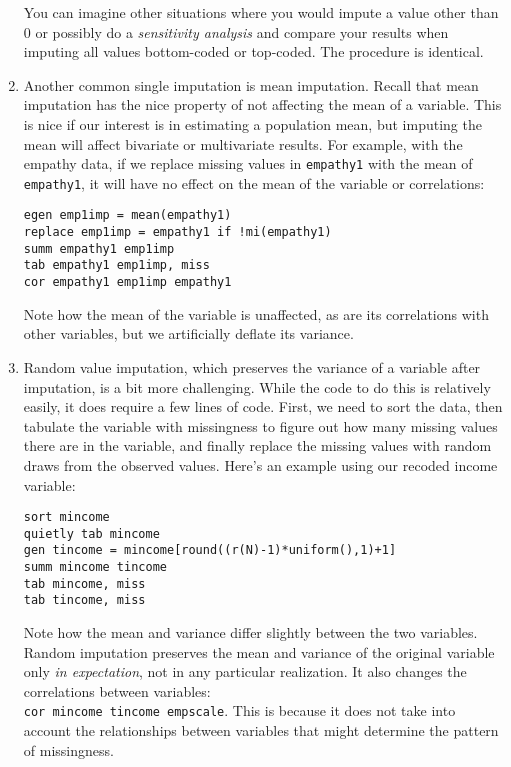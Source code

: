 \documentclass[a4paper,12pt]{article}
\begin{document}
\begin{enumerate}
You can imagine other situations where you would impute a value other than 0 or possibly do a {\em sensitivity analysis} and compare your results when imputing all values bottom-coded or top-coded. The procedure is identical.

\item Another common single imputation is mean imputation. Recall that mean imputation has the nice property of not affecting the mean of a variable. This is nice if our interest is in estimating a population mean, but imputing the mean will affect bivariate or multivariate results. For example, with the empathy data, if we replace missing values in \texttt{empathy1} with the mean of \texttt{empathy1}, it will have no effect on the mean of the variable or correlations:
\begin{verbatim}
egen emp1imp = mean(empathy1)
replace emp1imp = empathy1 if !mi(empathy1)
summ empathy1 emp1imp
tab empathy1 emp1imp, miss
cor empathy1 emp1imp empathy1
\end{verbatim}

Note how the mean of the variable is unaffected, as are its correlations with other variables, but we artificially deflate its variance.

\item Random value imputation, which preserves the variance of a variable after imputation, is a bit more challenging. While the code to do this is relatively easily, it does require a few lines of code. First, we need to sort the data, then tabulate the variable with missingness to figure out how many missing values there are in the variable, and finally replace the missing values with random draws from the observed values. Here's an example using our recoded income variable:
\begin{verbatim}
sort mincome
quietly tab mincome
gen tincome = mincome[round((r(N)-1)*uniform(),1)+1]
summ mincome tincome
tab mincome, miss
tab tincome, miss
\end{verbatim}

Note how the mean and variance differ slightly between the two variables. Random imputation preserves the mean and variance of the original variable only {\em in expectation}, not in any particular realization. It also changes the correlations between variables:\\
\texttt{cor mincome tincome empscale}. This is because it does not take into account the relationships between variables that might determine the pattern of missingness.


\end{enumerate}
\end{document}
